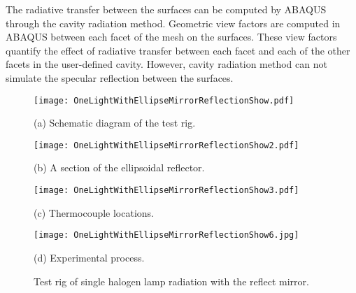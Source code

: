 The radiative transfer between the surfaces can be computed by ABAQUS through the cavity radiation method. Geometric view factors are computed in ABAQUS between each facet of the mesh on the surfaces. These view factors quantify the effect of radiative transfer between each facet and each of the other facets in the user-defined cavity. However, cavity radiation method can not simulate the specular reflection between the surfaces. 

\begin{figure}
  \begin{minipage}[t]{0.5\linewidth} %
  \nonumber
    \centering
    \texttt{[image: OneLightWithEllipseMirrorReflectionShow.pdf]}
    \centerline{(a) Schematic diagram of the test rig.}
    \label{Fig:OneLightWithEllipseMirrorReflectionShow}
  \end{minipage}%
  \begin{minipage}[t]{0.5\linewidth}
    \centering
    \texttt{[image: OneLightWithEllipseMirrorReflectionShow2.pdf]}
    \centerline{(b) A section of the ellipsoidal reflector.}
    \label{Fig:OneLightWithEllipseMirrorReflectionShow2}
  \end{minipage}

  \begin{minipage}[t]{0.5\linewidth} %
  \nonumber
    \centering
    \texttt{[image: OneLightWithEllipseMirrorReflectionShow3.pdf]}
    \centerline{(c) Thermocouple locations.}
    \label{Fig:OneLightWithEllipseMirrorReflectionShow3}
  \end{minipage}%
  \begin{minipage}[t]{0.5\linewidth}
    \centering
    \texttt{[image: OneLightWithEllipseMirrorReflectionShow6.jpg]}
    \centerline{(d) Experimental process.}
    \label{Fig:OneLightWithEllipseMirrorReflectionShow6}
  \end{minipage}


  \caption{Test rig of single halogen lamp radiation with the reflect mirror.}
  \label{Fig:OneLightWithEllipseMirrorReflectionShow}
\end{figure}

